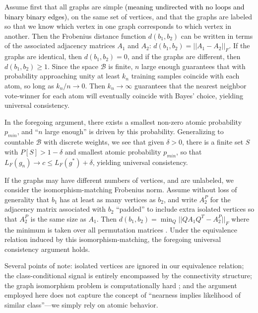\documentclass{article}
\newcommand{\mB}{\mathcal{B}}
\providecommand{\tr}[1]{\textcolor{black}{#1}}
\begin{document}
Assume first that all graphs are simple \tr{(meaning undirected with no loops and binary binary edges)}, on the same set of vertices, and that the graphs are labeled so that we know which vertex in one graph corresponds to which vertex in another. Then the Frobenius distance function $d(b_1,b_2)$ can be written in terms of the associated adjacency matrices $A_1$ and $A_2$: $d(b_1,b_2) = ||A_1-A_2||_F$. If the graphs are identical, then $d(b_1,b_2) = 0$, and if the graphs are different, then $d(b_1,b_2) \geq 1$. Since the space $\mB$ is finite, $n$ large enough guarantees that with probability approaching unity at least $k_n$ training samples coincide with each atom, so long as $k_n/n \rightarrow 0$. Then $k_n \rightarrow \infty$ guarantees that the nearest neighbor vote-winner for each atom will eventually coincide with Bayes' choice, yielding universal consistency.

In the foregoing argument, there exists a smallest non-zero atomic probability $p_{min}$, and ``$n$ large enough'' is driven by this probability. Generalizing to countable $\mB$ with discrete weights, we see that given $\delta > 0$, there is a finite set $S$ with $P[S]>1-\delta$ and smallest atomic probability $p_{min}$, so that $L_{F}(g_n) \rightarrow c \leq L_{F}(g^*) + \delta$, yielding universal consistency.

If the graphs may have different numbers of vertices, and are unlabeled, we consider the isomorphism-matching Frobenius norm. Assume without loss of generality that $b_1$ has at least as many vertices as $b_2$, and write $A_2^P$ for the adjacency matrix associated with $b_2$ ``padded'' to include extra isolated vertices so that $A_2^P$ is the same size as $A_1$. Then $d(b_1,b_2) = \min_Q ||Q A_1 Q^T - A_2^P||_F$ where the minimum is taken over all permutation matrices \cite{HornJohnson90}. Under the equivalence relation induced by this isomorphism-matching, the foregoing universal consistency argument holds.

Several points of note:  isolated vertices are ignored in our equivalence relation; the class-conditional signal is entirely encompassed by the connectivity structure; the graph isomorphism problem is computationally hard \cite{ConroyLouis97,ZaslavskiyVert08}; and the argument employed here does not capture the concept of ``nearness implies likelihood of similar class''---we simply rely on atomic behavior.
\end{document}
